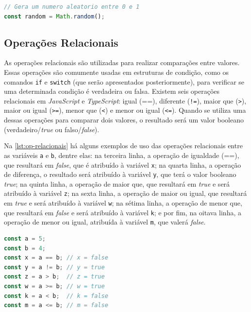 \begin{lstlisting}[language=TypeScript, caption=Exemplo de uso do método \texttt{Math.random()}., label=lst:math-random]
// Gera um numero aleatorio entre 0 e 1
const random = Math.random(); 
\end{lstlisting}



\subsection{Operações Relacionais}

As operações relacionais são utilizadas para realizar comparações entre valores. Essas operações são comumente usadas em estruturas de condição, como os comandos \texttt{if} e \texttt{switch} (que serão apresentados posteriormente), para verificar se uma determinada condição é verdadeira ou falsa. Existem seis operações relacionais em \textit{JavaScript} e \textit{TypeScript}: igual (==), diferente (\texttt{!=}), maior que (\texttt{>}), maior ou igual (\texttt{>=}), menor que (\texttt{<}) e menor ou igual (\texttt{<=}). Quando se utiliza uma dessas operações para comparar dois valores, o resultado será um valor booleano (verdadeiro/\textit{true} ou falso/\textit{false}).

Na \autoref{lst:op-relacionais} há alguns exemplos de uso das operações relacionais entre as variáveis \texttt{a} e \texttt{b}, dentre elas: na terceira linha, a operação de igualdade (==), que resultará em \textit{false}, que é atribuído à variável \texttt{x}; na quarta linha, a operação de diferença, o resultado será atribuído à variável \texttt{y}, que terá o valor booleano \textit{true}; na quinta linha, a operação de maior que, que resultará em \textit{true} e será atribuído à variável \texttt{z}; na sexta linha, a operação de maior ou igual, que resultará em \textit{true} e será atribuído à variável \texttt{w}; na sétima linha, a operação de menor que, que resultará em \textit{false} e será atribuído à variável \texttt{k}; e por fim, na oitava linha, a operação de menor ou igual, atribuída à variável \texttt{m}, que valerá \textit{false}.

\begin{lstlisting}[language=TypeScript, caption=Exemplo de Operações Relacionais em \textit{JavaScript} e \textit{TypeScript}., label=lst:op-relacionais]
const a = 5;
const b = 4;
const x = a == b; // x = false 
const y = a != b; // y = true
const z = a > b;  // z = true
const w = a >= b; // w = true
const k = a < b;  // k = false
const m = a <= b; // m = false
\end{lstlisting}

